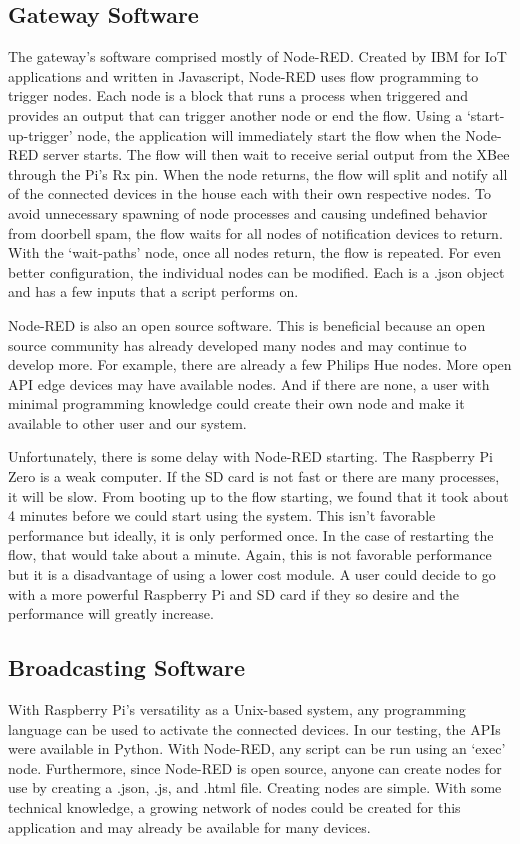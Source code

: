 \subsection{Gateway Software}
The gateway’s software comprised mostly of Node-RED. Created by IBM for IoT applications and written in Javascript, Node-RED uses flow programming to trigger nodes. Each node is a block that runs a process when triggered and provides an output that can trigger another node or end the flow. Using a ‘start-up-trigger’ node, the application will immediately start the flow when the Node-RED server starts. The flow will then wait to receive serial output from the XBee through the Pi’s Rx pin. When the node returns, the flow will split and notify all of the connected devices in the house each with their own respective nodes. To avoid unnecessary spawning of node processes and causing undefined behavior from doorbell spam, the flow waits for all nodes of notification devices to return. With the ‘wait-paths’ node, once all nodes return, the flow is repeated. For even better configuration, the individual nodes can be modified. Each is a .json object and has a few inputs that a script performs on.

Node-RED is also an open source software. This is beneficial because an open source community has already developed many nodes and may continue to develop more. For example, there are already a few Philips Hue nodes. More open API edge devices may have available nodes. And if there are none, a user with minimal programming knowledge could create their own node and make it available to other user and our system.

Unfortunately, there is some delay with Node-RED starting. The Raspberry Pi Zero is a weak computer. If the SD card is not fast or there are many processes, it will be slow. From booting up to the flow starting, we found that it took about 4 minutes before we could start using the system. This isn't favorable performance but ideally, it is only performed once. In the case of restarting the flow, that would take about a minute. Again, this is not favorable performance but it is a disadvantage of using a lower cost module. A user could decide to go with a more powerful Raspberry Pi and SD card if they so desire and the performance will greatly increase.

\subsection{Broadcasting Software}
With Raspberry Pi’s versatility as a Unix-based system, any programming language can be used to activate the connected devices. In our testing, the APIs were available in Python. With Node-RED, any script can be run using an ‘exec’ node. Furthermore, since Node-RED is open source, anyone can create nodes for use by creating a .json, .js, and .html file. Creating nodes are simple. With some technical knowledge, a growing network of nodes could be created for this application and may already be available for many devices.

